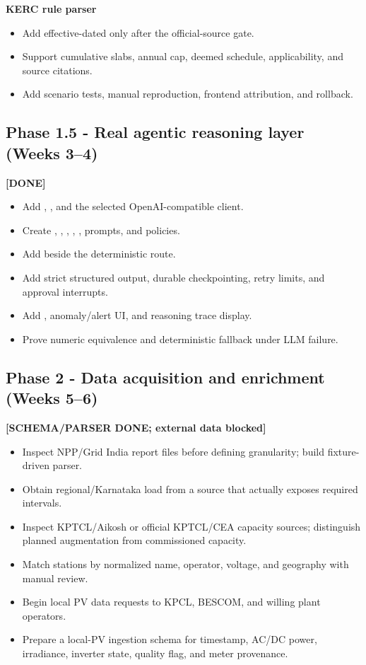 \textbf{KERC rule parser}
\begin{itemize}
  \item Add effective-dated  only after the official-source gate.
  \item Support cumulative slabs, annual cap, deemed schedule, applicability, and source citations.
  \item Add scenario tests, manual reproduction, frontend attribution, and rollback.
\end{itemize}

\subsection{Phase 1.5 - Real agentic reasoning layer (Weeks 3--4)} \textbf{[DONE]}

\begin{itemize}
  \item Add , , and the selected OpenAI-compatible client.
  \item Create , , ,
        , , prompts, and policies.
  \item Add  beside the deterministic route.
  \item Add strict structured output, durable checkpointing, retry limits, and approval interrupts.
  \item Add , anomaly/alert UI, and reasoning trace display.
  \item Prove numeric equivalence and deterministic fallback under LLM failure.
\end{itemize}

\subsection{Phase 2 - Data acquisition and enrichment (Weeks 5--6)} \textbf{[SCHEMA/PARSER DONE; external data blocked]}

\begin{itemize}
  \item Inspect NPP/Grid India report files before defining granularity; build fixture-driven parser.
  \item Obtain regional/Karnataka load from a source that actually exposes required intervals.
  \item Inspect KPTCL/Aikosh or official KPTCL/CEA capacity sources; distinguish planned augmentation
        from commissioned capacity.
  \item Match stations by normalized name, operator, voltage, and geography with manual review.
  \item Begin local PV data requests to KPCL, BESCOM, and willing plant operators.
  \item Prepare a local-PV ingestion schema for timestamp, AC/DC power, irradiance, inverter state,
        quality flag, and meter provenance.
\end{itemize}

